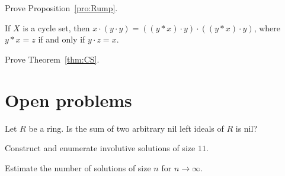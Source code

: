 
\begin{prob}
	\label{prob:Rump}
	Prove Proposition~\ref{pro:Rump}. 
\end{prob}

\begin{prob}
	If $X$ is a cycle set, then $x\cdot (y\cdot y)=((y*x)\cdot y)\cdot ((y*x)\cdot y)$, where
	$y*x=z$ if and only if $y\cdot z=x$. 
\end{prob}

\begin{prob}
	\label{prob:CS}
	Prove Theorem~\ref{thm:CS}. 
\end{prob}

\section*{Open problems}






\begin{problem}[K\"othe]
	\label{prob:Koethe}
	Let $R$ be a ring. Is the sum 
	of two arbitrary nil left ideals of $R$ is nil?
\end{problem}

\begin{problem}
	Construct and enumerate involutive solutions of size $11$. 
\end{problem}

\begin{problem}
	Estimate the number of solutions of size $n$ for $n\to\infty$. 
\end{problem}

